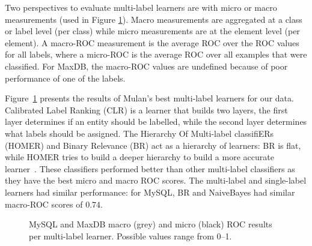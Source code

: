 \documentclass[]{sig-alternate}
\begin{document}
Two perspectives to evaluate multi-label learners are with micro or macro measurements (used in Figure \ref{fig:mulan}).
Macro measurements are aggregated at a class or label level (per class) while micro measurements are at the element level (per element).
A macro-ROC measurement is the average ROC over the ROC values for all labels, where a micro-ROC is the average ROC over all examples that were classified. 
For MaxDB, the macro-ROC values are undefined because of poor performance of one of the labels.%

Figure~\ref{fig:mulan} presents the results of Mulan's best multi-label learners for our data. 
Calibrated Label Ranking (CLR) is a learner that builds two layers, the first layer determines if an entity should be labelled, while the second layer determines what labels should be assigned.
The Hierarchy Of Multi-label classifiERs (HOMER) and Binary Relevance (BR) act as a hierarchy of learners: BR is flat, while HOMER tries to build a deeper hierarchy to build a more accurate learner~\cite{mulan}. 
These classifiers performed better than other multi-label classifiers as they have the best micro and macro ROC scores. 
The multi-label and single-label learners had similar performance: for MySQL, BR and NaiveBayes had similar macro-ROC scores of $0.74$.

\begin{figure}[]
\centering
{}
\caption[]{MySQL and MaxDB macro (grey) and micro (black) ROC results per multi-label learner. Possible values range from 0--1.
}
\label{fig:mulan}
\end{figure}
\end{document}
